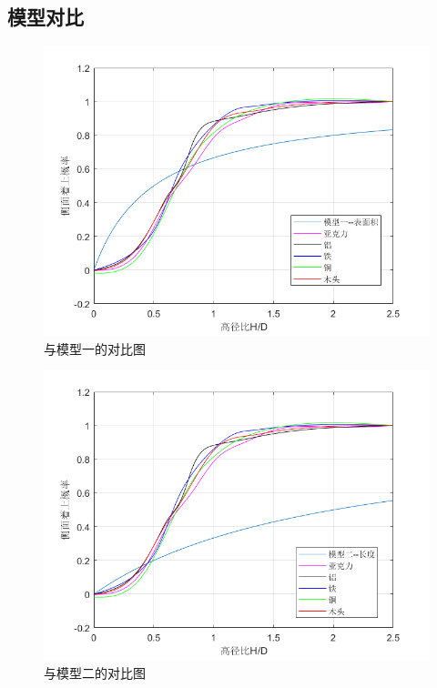 \documentclass[UTF8]{gapd}
\begin{document}
\subsection{模型对比}
\begin{figure}[h]%
	\centering
	\includegraphics[width=1\columnwidth]{images/比较1}
	\caption{与模型一的对比图}
	\label{fig:P2}%
\end{figure}
\begin{figure}[h]%
	\centering
	\includegraphics[width=1\columnwidth]{images/比较2}
	\caption{与模型二的对比图}
	\label{fig:P2}%
\end{figure}
\end{document}
